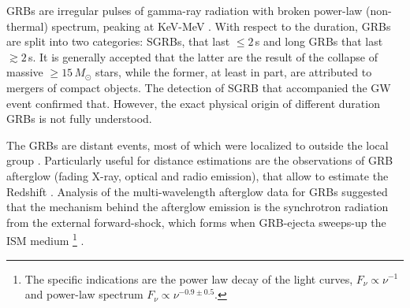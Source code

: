 \acp{GRB} are irregular pulses of gamma-ray radiation with broken power-law 
(non-thermal) spectrum, peaking at KeV-MeV \citep{Band:1993,Kouveliotou:1993,Meegan:1992xg}.
%
With respect to the duration, \acp{GRB} are split into two categories: \acp{SGRB}, 
that last ${\leq}2\,$s and long \acp{GRB} that last ${\gtrsim}2\,$s. 
It is generally accepted that the latter are the 
result of the collapse of massive ${\geq}15\,M_{\odot}$ stars, while the former, at 
least in part, are attributed to mergers of compact objects. 
%
The detection of \ac{SGRB} \GRB{} that accompanied 
the \ac{GW} event \GW{} \citep{TheLIGOScientific:2017qsa} confirmed that. 
However, the exact physical origin of different duration \acp{GRB} is not fully understood.
%

The \acp{GRB} are distant events, most of which were localized to outside the local 
group \citep[\eg][]{Mao:1992,Piran:1992,Fenimore:1993}. 
%
Particularly useful for distance estimations are the observations of \ac{GRB} afterglow
(fading X-ray, optical and radio emission), 
that allow to estimate the Redshift \citep[\eg][]{Costa:1997cg,Frontera:1997ae}.
%
Analysis of the multi-wavelength afterglow data for \acp{GRB} \citep[\eg][]{Panaitescu:2001bx} suggested that the mechanism behind the afterglow 
emission is the synchrotron radiation from the external forward-shock, which forms 
when \ac{GRB}-ejecta sweeps-up the \ac{ISM} medium
\footnote{
    The specific indications are the power law decay of the light curves, 
    $F_{\nu}\propto \nu^{-1}$ and power-law spectrum $F_{\nu}\propto\nu^{-0.9\pm 0.5}$.
} 
\citep{Rees:1992ek,Paczynski:1993gz,Meszaros:1993ju,Meszaros:1996sv}.
%

